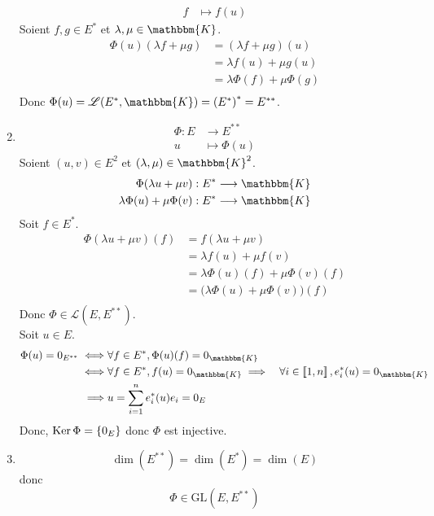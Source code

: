 \begin{enumerate}
\begin{align*}
			f &\longmapsto f(u)
		\end{align*}
		Soient $f,g \in E^*$ et $\lambda,\mu \in \mathbbm{K}$.
		\begin{align*}
			\Phi(u) (\lambda f + \mu g) &= (\lambda f + \mu g)(u) \\
			&= \lambda f(u) + \mu g(u) \\
			&= \lambda \Phi(f) + \mu \Phi(g) \\
		\end{align*}
		Donc $\Phi(u) = \mathcal{L}(E^*, \mathbbm{K}) = \left( E^* \right)^* = E^{**}$.
	\item \begin{align*}
			\Phi: E &\longrightarrow E^{**} \\
			u &\longmapsto \Phi(u)
		\end{align*}
		Soient $(u,v) \in E^2$ et $(\lambda, \mu) \in \mathbbm{K}^2$.
		\begin{align*}
			\Phi(\lambda u + \mu v) &: E^* \longrightarrow \mathbbm{K}\\
			\lambda \Phi(u) + \mu \Phi(v) &: E^* \longrightarrow \mathbbm{K}\\
		\end{align*}
		Soit $f \in E^*$.
		\begin{align*}
			\Phi(\lambda u + \mu v)(f) &= f(\lambda u + \mu v) \\
			&= \lambda f(u) + \mu f(v) \\
			&= \lambda \Phi(u)(f) + \mu \Phi(v)(f) \\
			&= \big(\lambda \Phi(u) + \mu \Phi(v)\big)(f) \\
		\end{align*}
		Donc $\Phi \in \mathcal{L}(E, E^{**})$.\\[2mm]
		Soit $u \in E$.
		\begin{align*}
			\Phi(u) = 0_{E^{**}} \iff& \forall f \in E^*, \Phi(u)(f) = 0_\mathbbm{K}\\
			\iff& \forall f \in E^*, f(u) = 0_\mathbbm{K}
			\implies& \forall i \in \left\llbracket 1,n \right\rrbracket, e_i^*(u) = 0_\mathbbm{K}\\
			\implies& u = \sum_{i=1}^n e_i^*(u) e_i = 0_E\\
		\end{align*}
		Donc, $\operatorname{Ker} \Phi = \{0_E\}$ donc $\Phi$ est injective.
	\item \[
			\dim(E^{**}) = \dim(E^*) = \dim(E)
		\] donc \[
			\Phi \in \mathrm{GL}(E, E^{**})
		\]
\end{enumerate}

